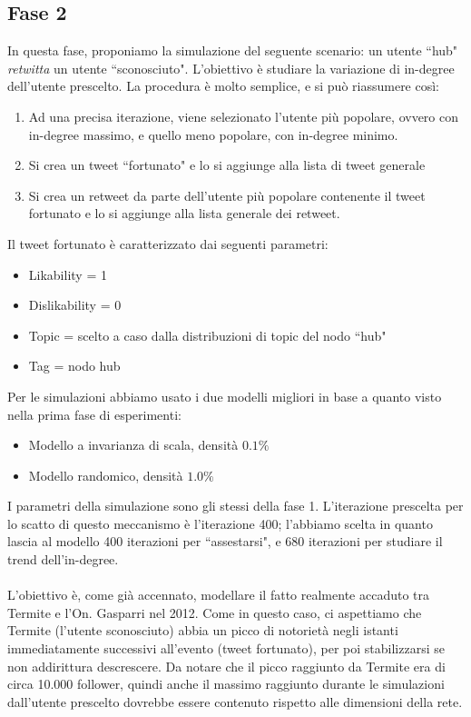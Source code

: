 \documentclass[a4paper,12pt]{article}
\begin{document}
\subsection{Fase 2}
In questa fase, proponiamo la simulazione del seguente scenario: un utente ``hub" \textit{retwitta} un utente ``sconosciuto". L'obiettivo è studiare la variazione di in-degree dell'utente prescelto. La procedura è molto semplice, e si può riassumere così:
\begin{enumerate}
\item Ad una precisa iterazione, viene selezionato l'utente più popolare, ovvero con in-degree massimo, e quello meno popolare, con in-degree minimo.
\item Si crea un tweet ``fortunato" e lo si aggiunge alla lista di tweet generale
\item Si crea un retweet da parte dell'utente più popolare contenente il tweet fortunato e lo si aggiunge alla lista generale dei retweet.  
\end{enumerate}
Il tweet fortunato è caratterizzato dai seguenti parametri:
\begin{itemize}
\item Likability = 1
\item Dislikability = 0
\item Topic = scelto a caso dalla distribuzioni di topic del nodo ``hub"
\item Tag = nodo hub
\end{itemize}
Per le simulazioni abbiamo usato i due modelli migliori in base a quanto visto nella prima fase di esperimenti:
\begin{itemize}
\item Modello a invarianza di scala, densità $0.1\%$
\item Modello randomico, densità $1.0\%$
\end{itemize}
I parametri della simulazione sono gli stessi della fase 1.
L'iterazione prescelta per lo scatto di questo meccanismo è l'iterazione 400; l'abbiamo scelta in quanto lascia al modello 400 iterazioni per ``assestarsi", e 680 iterazioni per studiare il trend dell'in-degree.
\\ \\
L'obiettivo è, come già accennato, modellare il fatto realmente accaduto tra Termite e l'On. Gasparri nel 2012. Come in questo caso, ci aspettiamo che Termite (l'utente sconosciuto) abbia un picco di notorietà negli istanti immediatamente successivi all'evento (tweet fortunato), per poi stabilizzarsi se non addirittura descrescere. Da notare che il picco raggiunto da Termite era di circa 10.000 follower, quindi anche il massimo raggiunto durante le simulazioni dall'utente prescelto dovrebbe essere contenuto rispetto alle dimensioni della rete.
\end{document}
